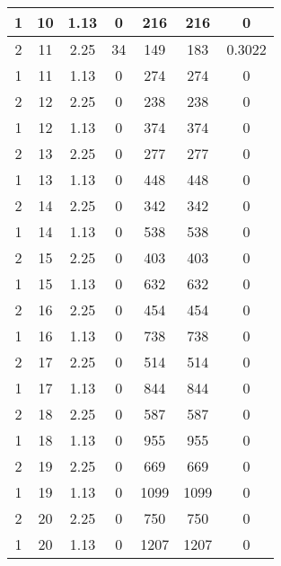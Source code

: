 \documentclass[letterpaper, 12pt]{article}
\begin{document}
\begin{longtable}{|c|c|c|c|c|c|c|}
\hline
1 & 10 & 1.13 & 0 & 216 & 216 & 0 \\
\hline
2 & 11 & 2.25 & 34 & 149 & 183 & 0.3022 \\
\hline
1 & 11 & 1.13 & 0 & 274 & 274 & 0 \\
\hline
2 & 12 & 2.25 & 0 & 238 & 238 & 0 \\
\hline
1 & 12 & 1.13 & 0 & 374 & 374 & 0 \\
\hline
2 & 13 & 2.25 & 0 & 277 & 277 & 0 \\
\hline
1 & 13 & 1.13 & 0 & 448 & 448 & 0 \\
\hline
2 & 14 & 2.25 & 0 & 342 & 342 & 0 \\
\hline
1 & 14 & 1.13 & 0 & 538 & 538 & 0 \\
\hline
2 & 15 & 2.25 & 0 & 403 & 403 & 0 \\
\hline
1 & 15 & 1.13 & 0 & 632 & 632 & 0 \\
\hline
2 & 16 & 2.25 & 0 & 454 & 454 & 0 \\
\hline
1 & 16 & 1.13 & 0 & 738 & 738 & 0 \\
\hline
2 & 17 & 2.25 & 0 & 514 & 514 & 0 \\
\hline
1 & 17 & 1.13 & 0 & 844 & 844 & 0 \\
\hline
2 & 18 & 2.25 & 0 & 587 & 587 & 0 \\
\hline
1 & 18 & 1.13 & 0 & 955 & 955 & 0 \\
\hline
2 & 19 & 2.25 & 0 & 669 & 669 & 0 \\
\hline
1 & 19 & 1.13 & 0 & 1099 & 1099 & 0 \\
\hline
2 & 20 & 2.25 & 0 & 750 & 750 & 0 \\
\hline
1 & 20 & 1.13 & 0 & 1207 & 1207 & 0 \\
\hline
\end{longtable}
\end{document}
